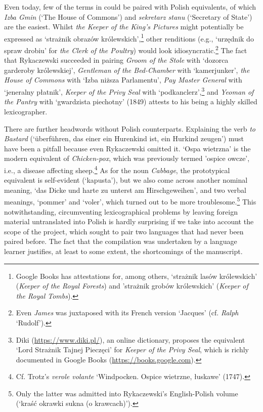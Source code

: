 \documentclass[output=paper,colorlinks,citecolor=brown,arabicfont,chinesefont]{langscibook}
\begin{document}
Even today, few of the terms in  could be paired with Polish equivalents, of which \textit{Izba Gmin} (`The House of Commons') and \textit{sekretarz stanu} (`Secretary of State') are the easiest. Whilst \emph{the Keeper of the King’s Pictures} might potentially be expressed as ‘strażnik obrazów królewskich’,\footnote{Google Books has attestations for, among others, ‘strażnik lasów królewskich' (\emph{Keeper of the Royal Forests}) and 'strażnik grobów królewskich' (\emph{Keeper of the Royal Tombs}).} other renditions (e.g., ‘urzędnik do spraw drobiu’ for \emph{the Clerk of the Poultry}) would look idiosyncratic.\footnote{Even \emph{James} was juxtaposed with its French version ‘Jacques’ (cf. \emph{Ralph} ‘Rudolf’).} The fact that Rykaczewski succeeded in pairing \emph{Groom of the Stole} with ‘dozorca garderoby królewskiej’, \emph{Gentleman of the Bed-Chamber} with ‘kamerjunker’, \emph{the House of Commons} with ‘Izba niższa Parlamentu’, \emph{Pay Master General} with ‘jeneralny płatnik’, \emph{Keeper of the Privy Seal} with ‘podkanclerz’,\footnote{Diki (\url{https://www.diki.pl/}), an online dictionary, proposes the equivalent ‘Lord Strażnik Tajnej Pieczęci’ for \emph{Keeper of the Privy Seal}, which is richly documented in Google Books (\url{https://books.google.com}).}  and \emph{Yeoman of the Pantry} with ‘gwardzista piechotny’ (1849) attests to his being a highly skilled lexicographer.

There are further headwords without Polish counterparts. Explaining the verb \emph{to Bastard} (‘überführen, das einer ein Hurenkind ist, ein Hurkind zeugen’) must have been a pitfall because even Rykaczewski omitted it. ‘Ospa wietrzna’ is the modern equivalent of \emph{Chicken-pox}, which was previously termed 'ospice owcze', i.e., a disease affecting sheep.\footnote{Cf. Trotz’s \emph{verole volante} ‘Windpocken. Ospice wietrzne, łuskawe’ (1747).} As for the noun \emph{Cabbage}, the prototypical equivalent is self-evident (‘kapusta’), but we also come across another nominal meaning, ‘das Dicke und harte zu unterst am Hirschgeweihen’, and two verbal meanings, ‘pommer’ and ‘voler’, which turned out to be more troublesome.\footnote{Only the latter was admitted into Rykaczewski’s English-Polish volume (‘kraść okrawki sukna (o krawcach)’).} This notwithstanding, circumventing lexicographical problems by leaving foreign material untranslated into Polish is hardly surprising if we take into account the scope of the project, which sought to pair two languages that had never been paired before. The fact that the compilation was undertaken by a language learner justifies, at least to some extent, the shortcomings of the manuscript.
\end{document}
